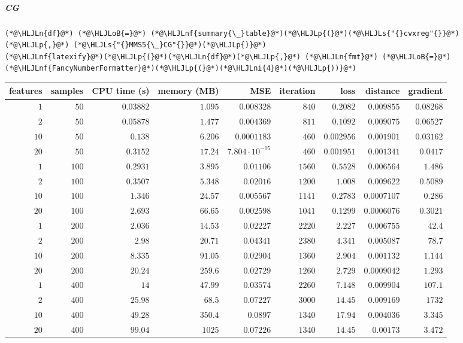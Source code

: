 \documentclass[12pt,a4paper]{article}
\newcommand{\HLJLn}[1]{#1}
\newcommand{\HLJLnf}[1]{\textcolor[RGB]{66,102,213}{#1}}
\newcommand{\HLJLs}[1]{\textcolor[RGB]{201,61,57}{#1}}
\newcommand{\HLJLni}[1]{\textcolor[RGB]{59,151,46}{#1}}
\newcommand{\HLJLoB}[1]{\textcolor[RGB]{102,102,102}{\textbf{#1}}}
\newcommand{\HLJLp}[1]{#1}
\begin{document}
\subparagraph{CG}

\begin{lstlisting}
(*@\HLJLn{df}@*) (*@\HLJLoB{=}@*) (*@\HLJLnf{summary{\_}table}@*)(*@\HLJLp{(}@*)(*@\HLJLs{"{}cvxreg"{}}@*)(*@\HLJLp{,}@*) (*@\HLJLs{"{}MMS5{\_}CG"{}}@*)(*@\HLJLp{)}@*)
(*@\HLJLnf{latexify}@*)(*@\HLJLp{(}@*)(*@\HLJLn{df}@*)(*@\HLJLp{,}@*) (*@\HLJLn{fmt}@*) (*@\HLJLoB{=}@*) (*@\HLJLnf{FancyNumberFormatter}@*)(*@\HLJLp{(}@*)(*@\HLJLni{4}@*)(*@\HLJLp{))}@*)
\end{lstlisting}


\begin{tabular}
{r | r | r | r | r | r | r | r | r}
features & samples & CPU time (s) & memory (MB) & MSE & iteration & loss & distance & gradient \\
\hline
$1$ & $50$ & $0.03882$ & $1.095$ & $0.008328$ & $840$ & $0.2082$ & $0.009855$ & $0.08268$ \\
$2$ & $50$ & $0.05878$ & $1.477$ & $0.004369$ & $811$ & $0.1092$ & $0.009075$ & $0.06527$ \\
$10$ & $50$ & $0.138$ & $6.206$ & $0.0001183$ & $460$ & $0.002956$ & $0.001901$ & $0.03162$ \\
$20$ & $50$ & $0.3152$ & $17.24$ & $7.804 \cdot 10^{-05}$ & $460$ & $0.001951$ & $0.001341$ & $0.0417$ \\
$1$ & $100$ & $0.2931$ & $3.895$ & $0.01106$ & $1560$ & $0.5528$ & $0.006564$ & $1.486$ \\
$2$ & $100$ & $0.3507$ & $5.348$ & $0.02016$ & $1200$ & $1.008$ & $0.009622$ & $0.5089$ \\
$10$ & $100$ & $1.346$ & $24.57$ & $0.005567$ & $1141$ & $0.2783$ & $0.0007107$ & $0.286$ \\
$20$ & $100$ & $2.693$ & $66.65$ & $0.002598$ & $1041$ & $0.1299$ & $0.0006076$ & $0.3021$ \\
$1$ & $200$ & $2.036$ & $14.53$ & $0.02227$ & $2220$ & $2.227$ & $0.006755$ & $42.4$ \\
$2$ & $200$ & $2.98$ & $20.71$ & $0.04341$ & $2380$ & $4.341$ & $0.005087$ & $78.7$ \\
$10$ & $200$ & $8.335$ & $91.05$ & $0.02904$ & $1360$ & $2.904$ & $0.001132$ & $1.144$ \\
$20$ & $200$ & $20.24$ & $259.6$ & $0.02729$ & $1260$ & $2.729$ & $0.0009042$ & $1.293$ \\
$1$ & $400$ & $14$ & $47.99$ & $0.03574$ & $2260$ & $7.148$ & $0.009904$ & $107.1$ \\
$2$ & $400$ & $25.98$ & $68.5$ & $0.07227$ & $3000$ & $14.45$ & $0.009169$ & $1732$ \\
$10$ & $400$ & $49.28$ & $350.4$ & $0.0897$ & $1340$ & $17.94$ & $0.004036$ & $3.345$ \\
$20$ & $400$ & $99.04$ & $1025$ & $0.07226$ & $1340$ & $14.45$ & $0.00173$ & $3.472$ \\
\end{tabular}
\end{document}
